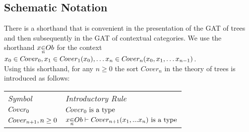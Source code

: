 \subsection {Schematic Notation}
\newcommand{\ft}[1]{
#1 \kern-6pt \raisebox{1.1ex}{$\leftrightline$} \kern-3pt \raisebox{.1ex}{$\downarrow$}}
\newcommand{\bbin}[1]{
\raisebox{-0.5em}{$\stackrel{\displaystyle{\in}} {\scriptstyle{#1}}$}
}
\newcommand{\ofTn}[3]{
\raisebox{0.25pt}{$#1$} \bbin{#2} #3}  %

\newcommand{\genericOb}{Ob} %

There is a  shorthand that is convenient in the presentation  of the GAT of trees  and then subsequently in the GAT of contextual categories. We use the shorthand
$\ofTn{x}{n}{\genericOb}$ for the context $x_0 \in C\kern-1pt over_{0},x_1 \in C\kern-1pt over_{1}(x_0), \hdots x_n \in C\kern-1pt over_{n}(x_0,x_1,\hdots x_{n-1}) $. \\

\noindent Using this shorthand, for any $n \geq 0$ the sort $Cover_{n}$  in the theory of trees is introduced as follows: \\

\vspace{0.03cm} 
\begin{tabular}{>{\itshape}l l}
Symbol & \itshape{Introductory Rule} \\
$C\kern-1pt over_{0}  $     & $C\kern-1pt over_{0}\mbox{ is a type}$\\
$C\kern-1pt over_{n+1}, n \geq 0 $ & $\ofTn{x}{n}{\genericOb}    \tstyle \isT{\Si{n+1}(\xn)} $\\
\end{tabular} \\
\vspace{.1cm}  \\


